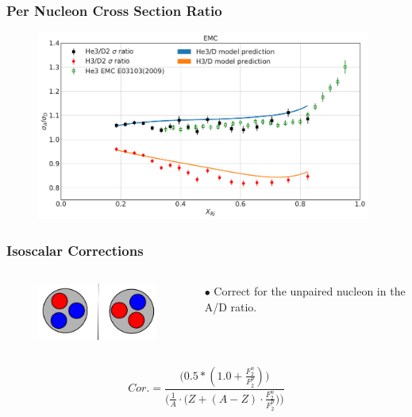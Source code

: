 \documentclass[12pt,usenames,dvipsnames]{beamer}
\begin{document}
\begin{frame}{}
\frametitle{Per Nucleon Cross Section Ratio}
\begin{figure}
	\includegraphics[width=11cm]{../images/EMC.pdf}
\end{figure}

\end{frame}

\begin{frame}{}
\frametitle{Isoscalar Corrections}
\vspace*{-1cm}
\begin{columns}
	\begin{figure}
		\includegraphics[width =5cm]{../images/mirror}
	\end{figure}
	$\bullet$ Correct for the unpaired nucleon in the A/D ratio.	
\end{columns}
\begin{equation}
Cor. = \frac{\Big(0.5*(1.0 + \frac{F_2^n}{F_2^p})\Big)}{ \Big(\frac{1}{A} \cdot \big(Z+(A-Z)\cdot \frac{F_2^n}{F_2^p}\big) \Big) }\nonumber
\end{equation}

\end{frame}
\end{document}
